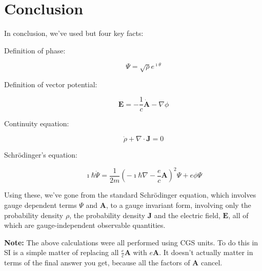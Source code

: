 
\section{Conclusion}
\label{sec:conclusion}

In conclusion, we've used but four key facts:

\begin{description}
    \item[Definition of phase:]
        $$ \Psi = \sqrt{\rho} e^{\imath \theta} $$
    \item[Definition of vector potential:]
        $$ \mathbf{E} = - \frac{1}{c} \mathbf{\dot A} - \nabla \phi $$
    \item[Continuity equation:]
        $$ \dot \rho + \nabla \cdot \mathbf{J} = 0 $$
    \item[Schr\"odinger's equation:]
        $$ \imath \hbar \dot \Psi = \frac{1}{2m} \left( - \imath \hbar \nabla -
           \frac{e}{c} \mathbf{A} \right)^2 \Psi + e \phi \Psi $$
\end{description}

Using these, we've gone from the standard Schr\"odinger equation, which involves
gauge dependent terms $\Psi$ and $\mathbf{A}$, to a gauge invariant form,
involving only the probability density $\rho$, the probability density
$\mathbf{J}$ and the electric field, $\mathbf{E}$, all of which are
gauge-independent observable quantities.

\vfill

\textbf{Note:} The above calculations were all performed using CGS units. To do
this in SI is a simple matter of replacing all $\frac{e}{c} \mathbf{A}$ with $e
\mathbf{A}$. It doesn't actually matter in terms of the final answer you get,
because all the factors of $\mathbf{A}$ cancel.
